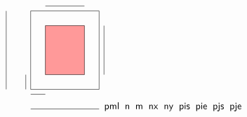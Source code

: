 \documentclass[10pt]{article}
\begin{document}
\[\begin{tikzpicture}
%
\node[draw=black,minimum width=7em,minimum height=8em,rectangle]  at (0,0) {};
\node[draw=black,fill=red!40,minimum width=4em,minimum height=5em,rectangle]  at (0,0) {};
%
%
\draw[] (-4em,-4em) -- (-4em,-2.5em);
\draw[] (-6em,-4em) -- (-6em,4em);
\draw[] (-3.5em,-4.5em) -- (-2em,-4.5em);
\draw[] (-3.5em,-6em) -- (3.5em,-6em);
%
\draw[] (4em,-2.5em) -- (4em,2.5em);
\draw[] (-2em,4.5em) -- (2em,4.5em);
\end{tikzpicture}
\\\\
\footnotesize{{\sf pml \;\; n \;\; m \;\; nx \;\; ny \;\; pis \;\; pie \;\; pjs \;\; pje}}\]
\end{document}
